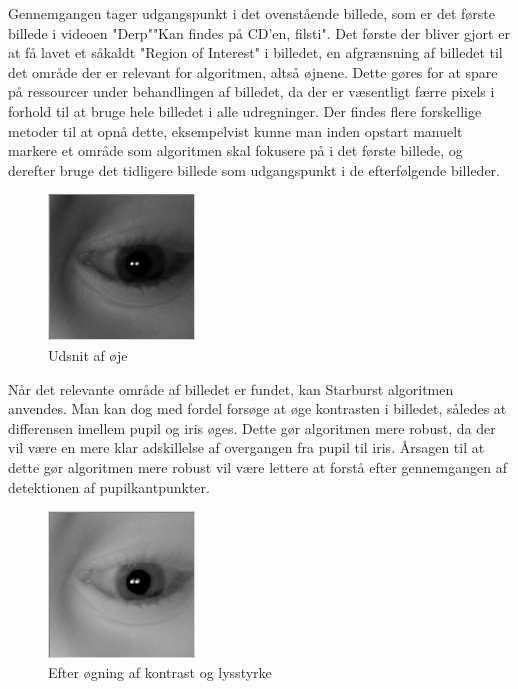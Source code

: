 \documentclass[rapport.tex]{subfiles}
\begin{document}
	Gennemgangen tager udgangspunkt i det ovenstående billede, som er det første billede i videoen "Derp""Kan findes på CD'en, filsti". Det første der bliver gjort er at få lavet et såkaldt "Region of Interest" i billedet, en afgrænsning af billedet til det område der er relevant for algoritmen, altså øjnene. Dette gøres for at spare på ressourcer under behandlingen af billedet, da der er væsentligt færre pixels i forhold til at bruge hele billedet i alle udregninger. Der findes flere forskellige metoder til at opnå dette, eksempelvist kunne man inden opstart manuelt markere et område som algoritmen skal fokusere på i det første billede, og derefter bruge det tidligere billede som udgangspunkt i de efterfølgende billeder.
	
	\begin{figure}
	\centering
	\includegraphics[width=0.4\linewidth]{Billeder/CroppedEye.png}
	\caption{Udsnit af øje}
	\label{fig:CroppedEye}
	\end{figure}
	
	Når det relevante område af billedet er fundet, kan Starburst algoritmen anvendes. Man kan dog med fordel forsøge at øge kontrasten i billedet, således at differensen imellem pupil og iris øges. Dette gør algoritmen mere robust, da der vil være en mere klar adskillelse af overgangen fra pupil til iris. Årsagen til at dette gør algoritmen mere robust vil være lettere at forstå efter gennemgangen af detektionen af pupilkantpunkter.
	
	\begin{figure}
	\centering
	\includegraphics[width=0.4\linewidth]{Billeder/CroppedEye,PostBrightness.png}
	\caption{Efter øgning af kontrast og lysstyrke}
	\label{fig:CroppedEye,PostBrightness}
	\end{figure}
	
\end{document}
